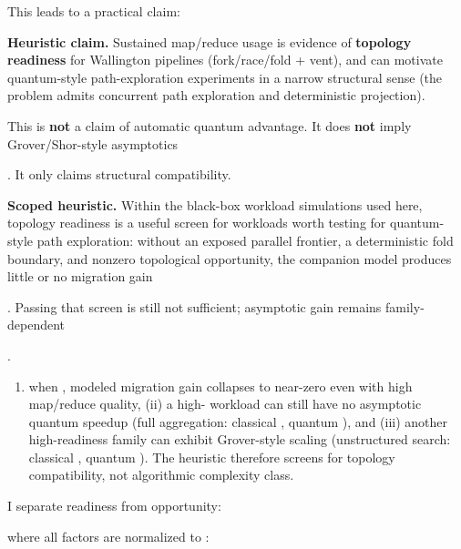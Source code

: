 \documentclass[
]{article}
\providecommand{\tightlist}{%
  \setlength{\itemsep}{0pt}\setlength{\parskip}{0pt}}
\begin{document}
This leads to a practical claim:

\textbf{Heuristic claim.} Sustained map/reduce usage is evidence of
\textbf{topology readiness} for Wallington pipelines (fork/race/fold +
vent), and can motivate quantum-style path-exploration experiments in a
narrow structural sense (the problem admits concurrent path exploration
and deterministic projection).

This is \textbf{not} a claim of automatic quantum advantage. It does
\textbf{not} imply Grover/Shor-style asymptotics

. It only claims structural compatibility.

\textbf{Scoped heuristic.} Within the black-box workload simulations
used here, topology readiness is a useful screen for workloads worth
testing for quantum-style path exploration: without an exposed parallel
frontier, a deterministic fold boundary, and nonzero topological
opportunity, the companion model produces little or no migration gain

. Passing that screen is still not sufficient; asymptotic gain remains
family-dependent

.

\begin{description}
\tightlist
\item[Executable companion coverage makes this boundary explicit]
\hfill
\begin{enumerate}
\def\labelenumi{(\roman{enumi})}
\tightlist
\item
  when , modeled migration gain collapses to near-zero even with high
  map/reduce quality, (ii) a high- workload can still have no asymptotic
  quantum speedup (full aggregation: classical , quantum ), and (iii)
  another high-readiness family can exhibit Grover-style scaling
  (unstructured search: classical , quantum ). The heuristic therefore
  screens for topology compatibility, not algorithmic complexity class.
\end{enumerate}
\end{description}

I separate readiness from opportunity:

where all factors are normalized to :
\end{document}
